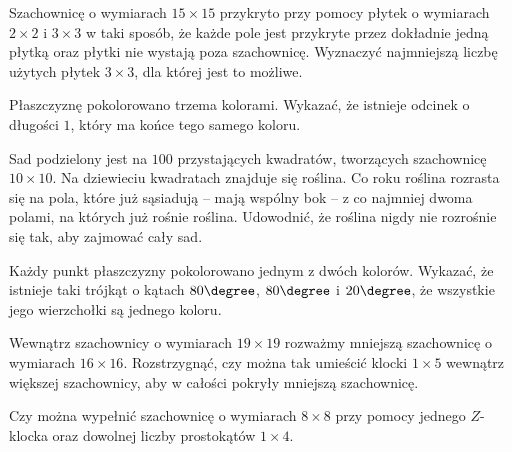 \begin{problem}{1}
	Szachownicę o wymiarach $15 \times 15$ przykryto przy pomocy płytek o wymiarach $2 \times 2$ i $3 \times 3$ w taki sposób, że każde pole jest przykryte przez dokładnie jedną płytką oraz płytki nie wystają poza szachownicę. Wyznaczyć najmniejszą liczbę użytych płytek $3 \times 3$, dla której jest to możliwe.
\end{problem}

\begin{problem}{2}
	Płaszczyznę pokolorowano trzema kolorami. Wykazać, że istnieje odcinek o długości $1$, który ma końce tego samego koloru.
\end{problem}

\begin{problem}{3}
	Sad podzielony jest na $100$ przystających kwadratów, tworzących szachownicę $10 \times 10$. Na dziewieciu kwadratach znajduje się roślina. Co roku roślina rozrasta się na pola, które już sąsiadują -- mają wspólny bok -- z co najmniej dwoma polami, na których już rośnie roślina. Udowodnić, że roślina nigdy nie rozrośnie się tak, aby zajmować cały sad.
\end{problem}
 
\begin{problem}{4}
	Każdy punkt płaszczyzny pokolorowano jednym z dwóch kolorów. Wykazać, że istnieje taki trójkąt o kątach $80\degree$, $80\degree$ i $20\degree$, że wszystkie jego wierzchołki są jednego koloru.
\end{problem}

\begin{problem}{5}
	Wewnątrz szachownicy o wymiarach $19 \times 19$ rozważmy mniejszą szachownicę o wymiarach $16 \times 16$. Rozstrzygnąć, czy można tak umieścić klocki $1 \times 5$ wewnątrz większej szachownicy, aby w całości pokryły mniejszą szachownicę.
\end{problem}

\begin{problem}{6}
	Czy można wypełnić szachownicę o wymiarach $8 \times 8$ przy pomocy jednego $Z$-klocka oraz dowolnej liczby prostokątów $1 \times 4$.
\end{problem}


